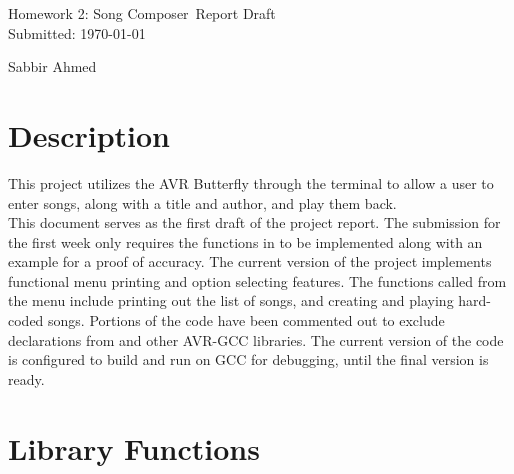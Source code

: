\documentclass[usletter, 12pt]{article}
\newcommand{\project}{Homework 2: Song Composer}
\newcommand{\Sabbir}{Sabbir Ahmed}
\begin{document}

    \begin{titlepage}

        \vspace*{\fill} %
        \begin{center}

            {\LARGE \project~Report Draft}\\ [1.5cm]

            Submitted: \today
            
            \vspace*{\fill}

            \Sabbir

        \end{center}
        \vspace*{\fill} %

    \end{titlepage}

    \section{Description}

    This project utilizes the AVR Butterfly through the terminal to allow a user to enter songs, along with a title and author, and play them back. \\

    \noindent This document serves as the first draft of the project report. The submission for the first week only requires the functions in  to be implemented along with an example for a proof of accuracy. The current version of the project implements functional menu printing and option selecting features. The functions called from the menu include printing out the list of songs, and creating and playing hard-coded songs. Portions of the code have been commented out to exclude declarations from  and other AVR-GCC libraries. The current version of the code is configured to build and run on GCC for debugging, until the final version is ready.

    \section{Library Functions}
\end{document}

